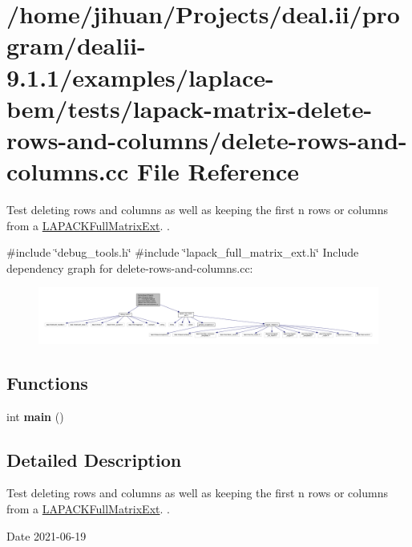 \hypertarget{delete-rows-and-columns_8cc}{}\section{/home/jihuan/\+Projects/deal.ii/program/dealii-\/9.1.1/examples/laplace-\/bem/tests/lapack-\/matrix-\/delete-\/rows-\/and-\/columns/delete-\/rows-\/and-\/columns.cc File Reference}
\label{delete-rows-and-columns_8cc}


Test deleting rows and columns as well as keeping the first {\ttfamily n} rows or columns from a \hyperlink{classLAPACKFullMatrixExt}{L\+A\+P\+A\+C\+K\+Full\+Matrix\+Ext}. .  


{\ttfamily \#include \char`\"{}debug\+\_\+tools.\+h\char`\"{}}\newline
{\ttfamily \#include \char`\"{}lapack\+\_\+full\+\_\+matrix\+\_\+ext.\+h\char`\"{}}\newline
Include dependency graph for delete-\/rows-\/and-\/columns.cc\+:\nopagebreak
\begin{figure}[H]
\begin{center}
\leavevmode
\includegraphics[width=350pt]{delete-rows-and-columns_8cc__incl}
\end{center}
\end{figure}
\subsection*{Functions}
\begin{DoxyCompactItemize}
\item 
\mbox{\label{delete-rows-and-columns_8cc_ae66f6b31b5ad750f1fe042a706a4e3d4}} 
int {\bfseries main} ()
\end{DoxyCompactItemize}


\subsection{Detailed Description}
Test deleting rows and columns as well as keeping the first {\ttfamily n} rows or columns from a \hyperlink{classLAPACKFullMatrixExt}{L\+A\+P\+A\+C\+K\+Full\+Matrix\+Ext}. . 

\begin{DoxyDate}{Date}
2021-\/06-\/19 
\end{DoxyDate}
